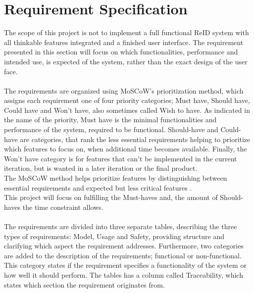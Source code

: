 \section{Requirement Specification} \label{sec:reqspec}

The scope of this project is not to implement a full functional \acs{ReID} system with all thinkable features integrated and a finished user interface. The requirement presented in this section will focus on which functionalities, performance and intended use, is expected of the system, rather than the exact design of the user face.
\\\\
The requirements are organized using MoSCoW's prioritization method, which assigns each requirement one of four priority categories; Must have, Should have, Could have and Won't have, also sometimes called Wish to have. As indicated in the name of the priority, Must have is the minimal functionalities and performance of the system, required to be functional. Should-have and Could-have are categories, that rank the less essential requirements helping to prioritize which features to focus on, when additional time becomes available. Finally, the Won't have category is for features that can't be implemented in the current iteration, but is wanted in a later iteration or the final product. 
\\
The MoSCoW method helps prioritize features by distinguishing between essential requirements and expected but less critical features \cite{Moscow}. 
\\
This project will focus on fulfilling the Must-haves and, the amount of Should-haves the time constraint allows.
\\\\
The requirements are divided into three separate tables, describing the three types of requirements: Model, Usage and Safety, providing structure and clarifying which aspect the requirement addresses. Furthermore, two categories are added to the description of the requirements; functional or non-functional. This category states if the requirement specifies a functionality of the system or how well it should perform. The tables has a column called Traceability, which states which section the requirement originates from.

